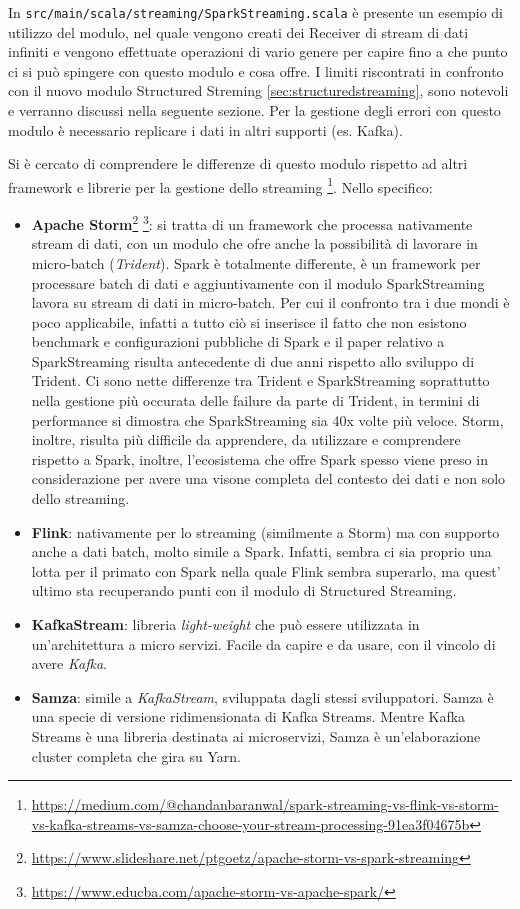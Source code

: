 \documentclass[12pt,italian]{article}
\begin{document}
\par In \texttt{src/main/scala/streaming/SparkStreaming.scala} è presente un esempio di utilizzo del modulo, nel quale vengono creati dei Receiver di stream di dati infiniti e vengono effettuate operazioni di vario genere per capire fino a che punto ci si può spingere con questo modulo e cosa offre. I limiti riscontrati in confronto con il nuovo modulo Structured Streming \ref{sec:structuredstreaming}, sono notevoli e verranno discussi nella seguente sezione. %
Per la gestione degli errori con questo modulo è necessario replicare i dati in altri supporti (es. Kafka).
\par Si è cercato di comprendere le differenze di questo modulo rispetto ad altri framework e librerie per la gestione dello streaming \footnote{\url{https://medium.com/@chandanbaranwal/spark-streaming-vs-flink-vs-storm-vs-kafka-streams-vs-samza-choose-your-stream-processing-91ea3f04675b}}. Nello specifico:
\begin{itemize}
	\item \textbf{Apache Storm}\footnote{\url{https://www.slideshare.net/ptgoetz/apache-storm-vs-spark-streaming}} \footnote{\url{https://www.educba.com/apache-storm-vs-apache-spark/}}: si tratta di un framework che processa nativamente stream di dati, con un modulo che ofre anche la possibilità di lavorare in micro-batch (\textit{Trident}). Spark è totalmente differente, è un framework per processare batch di dati e aggiuntivamente con il modulo SparkStreaming lavora su stream di dati in micro-batch. Per cui il confronto tra i due mondi è poco applicabile, infatti a tutto ciò si inserisce il fatto che non esistono benchmark e configurazioni pubbliche di Spark e il paper relativo a SparkStreaming\cite{sparkStreaming} risulta antecedente di due anni rispetto allo sviluppo di Trident. Ci sono nette differenze tra Trident e SparkStreaming soprattutto nella gestione più occurata delle failure da parte di Trident, in termini di performance si dimostra che SparkStreaming sia 40x volte più veloce.
	Storm, inoltre, risulta più difficile da apprendere, da utilizzare e comprendere rispetto a Spark, inoltre, l'ecosistema che offre Spark spesso viene preso in considerazione per avere una visone completa del contesto dei dati e non solo dello streaming.
	\item \textbf{Flink}: nativamente per lo streaming (similmente a Storm) ma con supporto anche a dati batch, molto simile a Spark. Infatti, sembra ci sia proprio una lotta per il primato con Spark nella quale Flink sembra superarlo, ma quest' ultimo sta recuperando punti con il modulo di Structured Streaming.
	\item \textbf{KafkaStream}: libreria \textit{light-weight} che può essere utilizzata in un'architettura a micro servizi. Facile da capire e da usare, con il vincolo di avere \textit{Kafka}. 
	\item \textbf{Samza}: simile a \textit{KafkaStream}, sviluppata dagli stessi sviluppatori. Samza è una specie di versione ridimensionata di Kafka Streams. Mentre Kafka Streams è una libreria destinata ai microservizi, Samza è un'elaborazione cluster completa che gira su Yarn.
\end{itemize}
\end{document}
